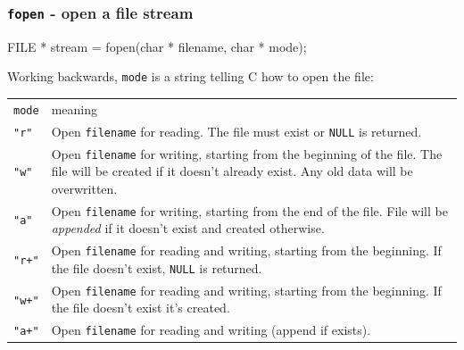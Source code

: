 \documentclass[table]{beamer}
\newif\ifschigh\schighfalse
\newcommand{\kw}[1]{\ifschigh\textcolor{red}{#1}\else\textcolor{keyword}{#1}\fi}
\begin{document}
\begin{frame}
\frametitle{{\tt fopen} - open a file stream}
\begin{semiverbatim}
\small
FILE * stream = fopen(\kw{char} * filename, \kw{char} * mode);
\end{semiverbatim}

Working backwards, {\tt mode} is a string telling C how to open the file:
{\footnotesize
\begin{center}
\begin{tabular}{l p{250pt}}
\tt mode& meaning\\
\tt "r"& Open {\tt filename} for reading. The file must exist or {\tt NULL} is returned.\\
\tt "w"& Open {\tt filename} for writing, starting from the beginning of the file. The file will be created if it doesn't already exist. Any old data will be overwritten.\\
\tt "a"& Open {\tt filename} for writing, starting from the end of the file. File will be \emph{appended} if it doesn't exist and created otherwise.\\
\tt "r+"& Open {\tt filename} for reading and writing, starting from the beginning. If the file doesn't exist, {\tt NULL} is returned.\\
\tt "w+"& Open {\tt filename} for reading and writing, starting from the beginning. If the file doesn't exist it's created.\\
\tt "a+"& Open {\tt filename} for reading and writing (append if exists).
\end{tabular}
\end{center}}
\end{frame}
\end{document}
